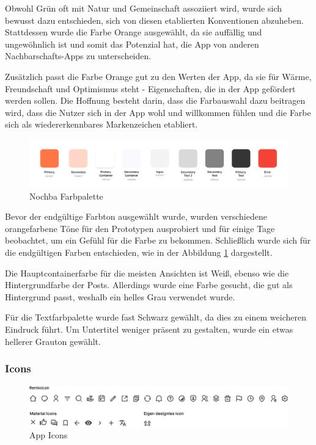 Obwohl Grün oft mit Natur und Gemeinschaft assoziiert wird, wurde sich bewusst dazu entschieden, sich von diesen etablierten Konventionen abzuheben. Stattdessen wurde die Farbe Orange ausgewählt, da sie auffällig und ungewöhnlich ist und somit das Potenzial hat, die App von anderen Nachbarschafts-Apps zu unterscheiden.

Zusätzlich passt die Farbe Orange gut zu den Werten der App, da sie für Wärme, Freundschaft und Optimismus steht - Eigenschaften, die in der App gefördert werden sollen. Die Hoffnung besteht darin, dass die Farbauswahl dazu beitragen wird, dass die Nutzer sich in der App wohl und willkommen fühlen und die Farbe sich als wiedererkennbares Markenzeichen etabliert.


\begin{figure}[h]
  \centering
  \includegraphics[width=1\textwidth]{pics/colors.png}
  \caption{Nochba Farbpalette}
  \label{fig:color-chart}
\end{figure}

Bevor der endgültige Farbton ausgewählt wurde, wurden verschiedene orangefarbene Töne für den Prototypen ausprobiert und für einige Tage beobachtet, um ein Gefühl für die Farbe zu bekommen. Schließlich wurde sich für die endgültigen Farben entschieden, wie in der Abbildung \ref{fig:color-chart} dargestellt.

Die Hauptcontainerfarbe für die meisten Ansichten ist Weiß, ebenso wie die Hintergrundfarbe der Posts. Allerdings wurde eine Farbe gesucht, die gut als Hintergrund passt, weshalb ein helles Grau verwendet wurde.

Für die Textfarbpalette wurde fast Schwarz gewählt, da dies zu einem weicheren Eindruck führt. Um Untertitel weniger präsent zu gestalten, wurde ein etwas hellerer Grauton gewählt.


\subsubsection{Icons}


\begin{figure}[ht]
  \centering
  \includegraphics[width=1\textwidth]{pics/icons.png}
  \caption{App Icons}
  \label{fig:app-icons}
\end{figure}

